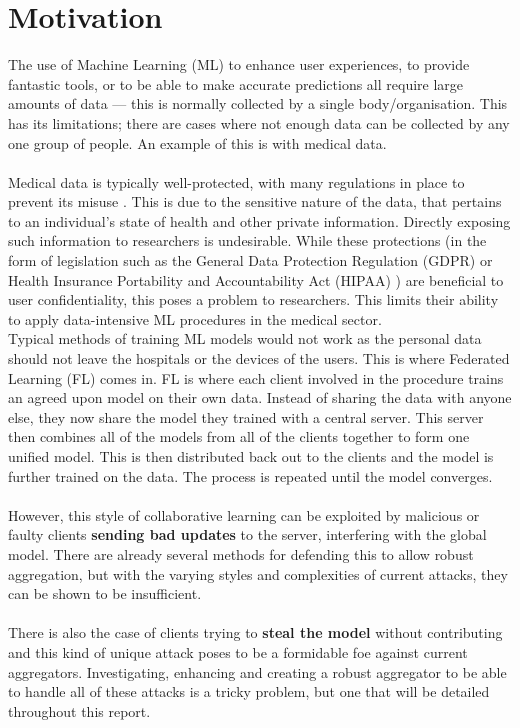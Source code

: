 \section{Motivation}
The use of Machine Learning (ML) to enhance user experiences, to provide fantastic tools, or to be able to make accurate predictions all require large amounts of data --- this is normally collected by a single body/organisation.
This has its limitations; there are cases where not enough data can be collected by any one group of people. 
An example of this is with medical data.
\\ \\
Medical data is typically well-protected, with many regulations in place to prevent its misuse \cite{nhs_digital_data}.  
This is due to the sensitive nature of the data, that pertains to an individual's state of health and other private information.
Directly exposing such information to researchers is undesirable. 
While these protections (in the form of legislation such as the General Data Protection Regulation (GDPR) \cite{gdpr} or Health Insurance Portability and Accountability Act (HIPAA) \cite{hipaa}) are beneficial to user confidentiality, this poses a problem to researchers. 
This limits their ability to apply data-intensive ML procedures in the medical sector.\\

Typical methods of training ML models would not work as the personal data should not leave the hospitals or the devices of the users. 
This is where Federated Learning (FL) \cite{federated_comic} comes in. 
FL is where each client involved in the procedure trains an agreed upon model on their own data. 
Instead of sharing the data with anyone else, they now share the model they trained with a central server. 
This server then combines all of the models from all of the clients together to form one unified model. 
This is then distributed back out to the clients and the model is further trained on the data. 
The process is repeated until the model converges.
\\ \\
However, this style of collaborative learning can be exploited by malicious or faulty clients \textbf{sending bad updates} to the server, interfering with the global model. 
There are already several methods for defending this to allow robust aggregation, but with the varying styles and complexities of current attacks, they can be shown to be insufficient.
\\ \\
There is also the case of clients trying to \textbf{steal the model} without contributing and this kind of unique attack poses to be a formidable foe against current aggregators.
Investigating, enhancing and creating a robust aggregator to be able to handle all of these attacks is a tricky problem, but one that will be detailed throughout this report.



